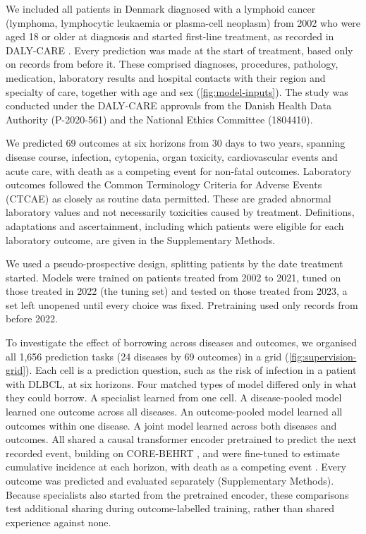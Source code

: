 We included all patients in Denmark diagnosed with a lymphoid cancer
(lymphoma, lymphocytic leukaemia or plasma-cell neoplasm) from 2002 who were
aged 18 or older at diagnosis and started first-line treatment, as recorded in
DALY-CARE \citep{brieghel2025dalycare}. Every prediction was made at the start of
treatment, based only on records from before it. These comprised diagnoses,
procedures, pathology, medication, laboratory results and hospital contacts with
their region and specialty of care, together with age and sex
(\cref{fig:model-inputs}). The study was conducted under the DALY-CARE approvals
from the Danish Health Data Authority (P-2020-561) and the National Ethics
Committee (1804410).

We predicted 69 outcomes at six horizons from 30 days to two years, spanning
disease course, infection, cytopenia, organ toxicity, cardiovascular events and
acute care, with death as a competing event for non-fatal outcomes. Laboratory
outcomes followed the Common Terminology Criteria for Adverse Events (CTCAE)
\citep{nci2017ctcae} as closely as routine data permitted. These are graded
abnormal laboratory values and not necessarily toxicities caused by treatment.
Definitions, adaptations and ascertainment, including which patients were
eligible for each laboratory outcome, are given in the Supplementary Methods.

We used a pseudo-prospective design, splitting patients by the date treatment
started. Models were trained on patients treated from 2002 to 2021, tuned on those
treated in 2022 (the tuning set) and tested on those treated from 2023, a set
left unopened until every choice was fixed. Pretraining used only records from
before 2022.

To investigate the effect of borrowing across diseases and outcomes, we
organised all 1,656 prediction tasks (24 diseases by 69 outcomes) in a grid
(\cref{fig:supervision-grid}). Each cell is a prediction question, such as the
risk of infection in a patient with DLBCL, at six horizons. Four matched types of model differed only in what they could
borrow. A specialist learned from one cell. A disease-pooled model learned one
outcome across all diseases. An outcome-pooled model learned all outcomes within
one disease. A joint model learned across both diseases and outcomes. All shared a causal transformer encoder
pretrained to predict the next recorded event, building on CORE-BEHRT
\citep{odgaard2024core}, and were fine-tuned to estimate cumulative incidence at
each horizon, with death as a competing event
\citep{gensheimer2019nnetsurvival,lee2018deephit}. Every outcome was predicted
and evaluated separately (Supplementary Methods). Because specialists also
started from the pretrained encoder, these comparisons test additional sharing
during outcome-labelled training, rather than shared experience against none.

